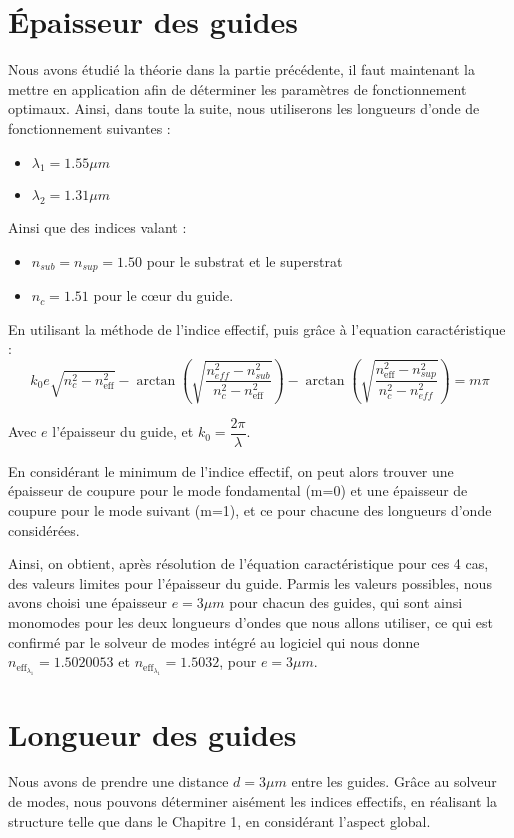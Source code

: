 \documentclass[a4paper,11pt]{report}
\begin{document}
\section{Épaisseur des guides}
Nous avons étudié la théorie dans la partie précédente, il faut maintenant la mettre en application afin de déterminer les paramètres de fonctionnement optimaux. Ainsi, dans toute la suite, nous utiliserons les longueurs d'onde de fonctionnement suivantes :
\begin{itemize}
    \item $\lambda_1=1.55\mu m$ 
    \item $\lambda_2=1.31\mu m$
\end{itemize}
Ainsi que des indices valant :
\begin{itemize}
    \item  $n_{sub}=n_{sup}=1.50$ pour le substrat et le superstrat
    \item  $n_{c}=1.51$ pour le cœur du guide.
    \newline
\end{itemize}

En utilisant la méthode de l'indice effectif, puis grâce à l'equation caractéristique :
\begin{equation}
    k_0e\sqrt{n_c^2-n_{\text{eff}}^2}-\arctan\left(\sqrt{\dfrac{n_{eff}^2-n_{sub}^2}{n_{c}^2-n_{\text{eff}}^2}}\right)-\arctan\left(\sqrt{\dfrac{n_{\text{eff}}^2-n_{sup}^2}{n_{c}^2-n_{eff}^2}}\right)=m\pi
\end{equation}

Avec $e$ l'épaisseur du guide, et $k_0=\dfrac{2\pi}{\lambda}$.

En considérant le minimum de l'indice effectif, on peut alors trouver une épaisseur de coupure pour le mode fondamental (m=0) et une épaisseur de coupure pour le mode suivant (m=1), et ce pour chacune des longueurs d'onde considérées.

Ainsi, on obtient, après résolution de l'équation caractéristique pour ces 4 cas, des valeurs limites pour l'épaisseur du guide. Parmis les valeurs possibles, nous avons choisi une épaisseur $e=3\mu m$ pour chacun des guides, qui sont ainsi monomodes pour les deux longueurs d'ondes que nous allons utiliser, ce qui est confirmé par le solveur de modes intégré au logiciel qui nous donne $n_{\text{eff}_{\lambda_1}}=1.5020053$ et $n_{\text{eff}_{\lambda_1}}=1.5032$, pour $e=3\mu m$.

\section{Longueur des guides}
Nous avons de prendre une distance $d=3\mu m$ entre les guides. Grâce au solveur de modes, nous pouvons déterminer aisément les indices effectifs, en réalisant la structure telle que dans le Chapitre 1, en considérant l'aspect global.
\end{document}
